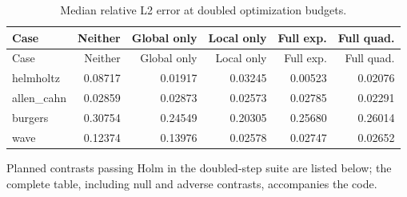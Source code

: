 \documentclass[
  11pt,
]{article}
\begin{document}
\begin{longtable}[]{@{}lrrrrr@{}}
\caption{Median relative L2 error at doubled optimization
budgets.}\tabularnewline
\toprule\noalign{}
Case & Neither & Global only & Local only & Full exp. & Full quad. \\
\midrule\noalign{}
\endfirsthead
\toprule\noalign{}
Case & Neither & Global only & Local only & Full exp. & Full quad. \\
\midrule\noalign{}
\endhead
\bottomrule\noalign{}
\endlastfoot
helmholtz & 0.08717 & 0.01917 & 0.03245 & 0.00523 & 0.02076 \\
allen\_cahn & 0.02859 & 0.02873 & 0.02573 & 0.02785 & 0.02291 \\
burgers & 0.30754 & 0.24549 & 0.20305 & 0.25680 & 0.26014 \\
wave & 0.12374 & 0.13976 & 0.02578 & 0.02747 & 0.02652 \\
\end{longtable}

\endgroup

Planned contrasts passing Holm in the doubled-step suite are listed
below; the complete table, including null and adverse contrasts,
accompanies the code.

\begingroup\small
\end{document}
